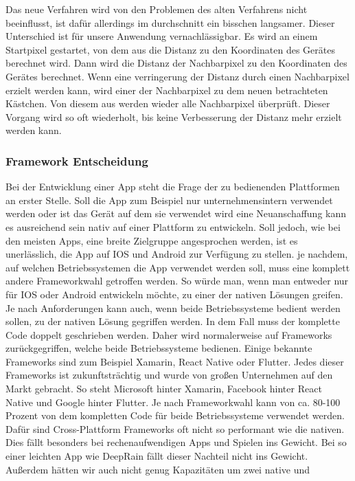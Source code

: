  \noindent Das neue Verfahren wird von den Problemen des alten Verfahrens nicht beeinflusst, ist dafür allerdings im durchschnitt ein bisschen langsamer. 
 Dieser Unterschied ist für unsere Anwendung vernachlässigbar. 
 Es wird an einem Startpixel gestartet, von dem aus die Distanz zu den Koordinaten des Gerätes berechnet wird. 
 Dann wird die Distanz der Nachbarpixel zu den Koordinaten des Gerätes berechnet. 
 Wenn eine verringerung der Distanz durch einen Nachbarpixel erzielt werden kann, wird einer der Nachbarpixel zu dem neuen betrachteten Kästchen. 
 Von diesem aus werden wieder alle Nachbarpixel überprüft. 
 Dieser Vorgang wird so oft wiederholt, bis keine Verbesserung der Distanz mehr erzielt werden kann.

\subsubsection{Framework Entscheidung}\label{framework entscheidung}
Bei der Entwicklung einer App steht die Frage der zu bedienenden Plattformen an erster Stelle. Soll die App zum Beispiel nur unternehmensintern verwendet 
werden oder ist das Gerät auf dem sie verwendet wird eine Neuanschaffung kann es ausreichend sein nativ auf einer Plattform zu entwickeln. Soll jedoch, 
wie bei den meisten Apps, eine breite Zielgruppe angesprochen werden, ist es unerlässlich, die App auf IOS und Android zur Verfügung zu stellen. 
je nachdem, auf welchen Betriebssystemen die App verwendet werden soll, muss eine komplett andere Frameworkwahl getroffen werden. 
So würde man, wenn man entweder nur für IOS oder Android entwickeln möchte, zu einer der nativen Lösungen greifen. Je nach Anforderungen kann auch, 
wenn beide Betriebssysteme bedient werden sollen, zu der nativen Lösung gegriffen werden. In dem Fall muss der komplette Code doppelt 
geschrieben werden. Daher wird normalerweise auf Frameworks zurückgegriffen, welche beide Betriebssysteme bedienen. 
Einige bekannte Frameworks sind zum Beispiel Xamarin, React Native oder Flutter. Jedes dieser Frameworks ist zukunftsträchtig und wurde von großen 
Unternehmen auf den Markt gebracht. So steht Microsoft hinter Xamarin, Facebook hinter React Native und Google hinter Flutter. 
Je nach Frameworkwahl kann von ca. 80-100 Prozent von dem kompletten Code für beide Betriebssysteme verwendet werden. 
Dafür sind Cross-Plattform Frameworks oft nicht so performant wie die nativen. Dies fällt besonders bei rechenaufwendigen Apps und Spielen ins Gewicht. 
Bei so einer leichten App wie DeepRain fällt dieser Nachteil nicht ins Gewicht. Außerdem hätten wir auch nicht genug Kapazitäten um zwei native und 
